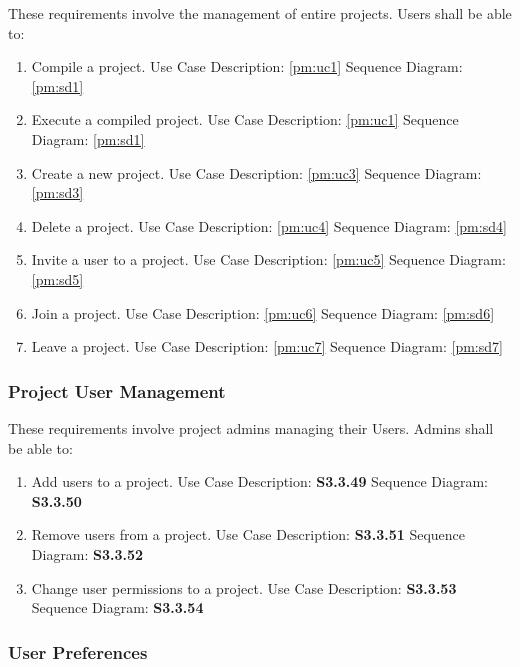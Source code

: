 \documentclass[twoside,letterpaper]{article}
\begin{document}
{These requirements involve the management of entire projects. Users shall be able to:

\begin{enumerate}
	\item Compile a project.  
		\subitem Use Case Description: \ref{pm:uc1}
		\subitem Sequence Diagram:  \ref{pm:sd1}
	\item Execute a compiled project. 
		\subitem Use Case Description: \ref{pm:uc1}
		\subitem Sequence Diagram:  \ref{pm:sd1}
	\item Create a new project. 
		\subitem Use Case Description: \ref{pm:uc3}
		\subitem Sequence Diagram:  \ref{pm:sd3}
	\item Delete a project. 
		\subitem Use Case Description: \ref{pm:uc4}
		\subitem Sequence Diagram:  \ref{pm:sd4}
	\item Invite a user to a project. 	
		\subitem Use Case Description: \ref{pm:uc5}
		\subitem Sequence Diagram:  \ref{pm:sd5}
	\item Join a project. 
		\subitem Use Case Description: \ref{pm:uc6}
		\subitem Sequence Diagram:  \ref{pm:sd6}
	\item Leave a project.
		\subitem Use Case Description: \ref{pm:uc7}
		\subitem Sequence Diagram:  \ref{pm:sd7}
\end{enumerate}

\subsubsection{Project User Management}

These requirements involve project admins managing their Users. Admins shall be able to:

\begin{enumerate}
	\item Add users to a project.
    \subitem Use Case Description: \textbf{S3.3.49}
		\subitem Sequence Diagram: \textbf{S3.3.50}
  \item Remove users from a project.
    \subitem Use Case Description: \textbf{S3.3.51}
		\subitem Sequence Diagram: \textbf{S3.3.52}
	\item Change user permissions to a project.
    \subitem Use Case Description: \textbf{S3.3.53}
		\subitem Sequence Diagram: \textbf{S3.3.54}
\end{enumerate}

\subsubsection{User Preferences}

}
\end{document}

